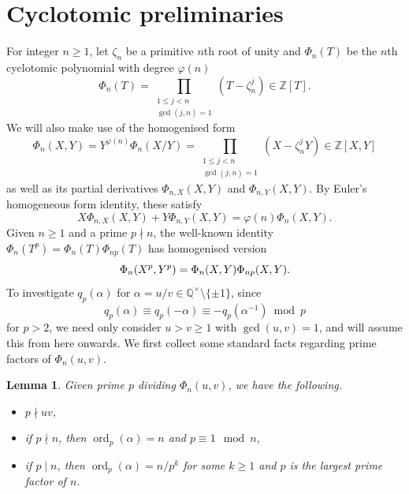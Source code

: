 \documentclass[10pt,a4paper]{amsart}
\newtheorem{lemma}[theorem]{Lemma}
\DeclareMathOperator{\ord}{ord}
\begin{document}
\section{Cyclotomic preliminaries}
For integer $n\geq 1$, let $\zeta_n$ be a primitive $n$th root of unity and $\Phi_n(T)$ be the $n$th cyclotomic polynomial with degree $\varphi(n)$
\begin{equation*}
\Phi_n(T)=\prod_{\substack{1\leq j<n \\ \gcd(j,n)=1}} \left(T-\zeta_n^j\right)\in\mathbb{Z}[T].
\end{equation*}
We will also make use of the homogenised form
\begin{equation}\label{homPhi}
\Phi_{n}(X,Y)=Y^{\varphi(n)}\Phi_n(X/Y)=
\prod_{\substack{1\leq j<n \\ \gcd(j,n)=1}} \left(X-\zeta_n^jY\right)\in\mathbb{Z}[X,Y]
\end{equation}
as well as its partial derivatives $\Phi_{n,X}(X,Y)$ and $\Phi_{n,Y}(X,Y)$. By Euler's homogeneous form identity, these satisfy
\begin{equation}\label{euler}
X\Phi_{n,X}(X,Y)+Y\Phi_{n,Y}(X,Y)=\varphi(n)\Phi_n(X,Y).
\end{equation}
Given $n\geq 1$ and a prime $p\nmid n$, the well-known identity $\Phi_n(T^p)=\Phi_n(T)\Phi_{np}(T)$ has homogenised version
\begin{equation}\label{Phinp}
\Phi_n(X^p,Y^p)=\Phi_n(X,Y)\Phi_{np}(X,Y). \\[10pt]
\end{equation}
To investigate $q_p(\alpha)$ for $\alpha=u/v\in\mathbb{Q}^\times\setminus\{\pm 1\}$, since 
\[q_p(\alpha)\equiv q_p(-\alpha)\equiv -q_p(\alpha^{-1})\bmod p\]
for $p>2$, we need only consider $u>v\geq 1$ with $\gcd(u,v)=1$, and will assume this from here onwards. 
We first collect some standard facts regarding prime factors of $\Phi_n(u,v)$. 
\begin{lemma}\label{ordlem}
Given prime $p$ dividing $\Phi_n(u,v)$, we have the following.
\begin{itemize}
\item[(i)]
$p\nmid uv$,
\item[(ii)]
if $p\nmid n$, then $\ord_p(\alpha)=n$ and $p\equiv 1\mod n$,
\item[(iii)]
if $p\mid n$, then $\ord_p(\alpha)=n/p^k$ for some $k\geq 1$ and $p$ is the largest prime factor of $n$.
\end{itemize}
\end{lemma}
\end{document}
